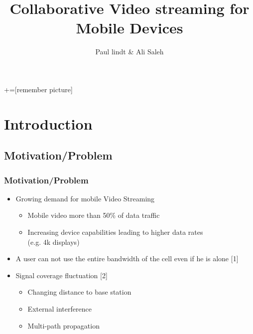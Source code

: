 \documentclass{beamer} %
\author{Paul lindt \& Ali Saleh}
\title{Collaborative Video streaming for Mobile Devices}
\begin{document}

\frame {
\titlepage
}
+=[remember picture]

\everymath{\displaystyle}
\section[Outline]{}
\frame{\tableofcontents}
\section{Introduction}
\subsection{Motivation/Problem}
\begin{frame}
\frametitle{Motivation/Problem}
\begin{itemize}
\item Growing demand for mobile Video Streaming
	\begin{itemize}
    	\item Mobile video more than 50\% of data traffic %
        \item Increasing device capabilities leading to higher data rates \\ (e.g. 4k displays)    
    \end{itemize}    
        \item A user can not use the entire bandwidth of the cell 		even if he is alone [1]
    \item Signal coverage fluctuation [2]
    \begin{itemize}
    	\item Changing distance to base station        
        \item External interference
        \item Multi-path propagation %
    \end{itemize}        
\end{itemize}


\end{frame}
\end{document}
